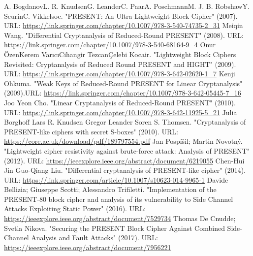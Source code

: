 \documentclass[journal=tosc,preprint]{iacrtrans}
\begin{document}
\begin{thebibliography}{}
	\bibitem{} A. BogdanovL. R. KnudsenG. LeanderC. PaarA. PoschmannM. J. B. RobshawY. SeurinC. Vikkelsoe. "PRESENT: An Ultra-Lightweight Block Cipher" (2007). 
	URL:  \href{https://link.springer.com/chapter/10.1007/978-3-540-74735-2_31} {https://link.springer.com/chapter/10.1007/978-3-540-74735-2\_31}
	\bibitem{} Meiqin Wang. "Differential Cryptanalysis of Reduced-Round PRESENT" (2008). URL: \href{https://link.springer.com/chapter/10.1007/978-3-540-68164-9_4}{https://link.springer.com/chapter/10.1007/978-3-540-68164-9\_4}
	\bibitem{} Onur ÖzenKerem VarıcıCihangir TezcanÇelebi Kocair. "Lightweight Block Ciphers
	Revisited: Cryptanalysis of Reduced Round PRESENT and HIGHT" (2009). URL: \href{https://link.springer.com/chapter/10.1007/978-3-642-02620-1_7}{https://link.springer.com/chapter/10.1007/978-3-642-02620-1\_7}
	\bibitem{} Kenji Ohkuma. "Weak Keys of Reduced-Round PRESENT for Linear Cryptanalysis"
	(2009).URL: \href{https://link.springer.com/chapter/10.1007/978-3-642-05445-7_16}{https://link.springer.com/chapter/10.1007/978-3-642-05445-7\_16}
	\bibitem{} Joo Yeon Cho. "Linear Cryptanalysis of Reduced-Round PRESENT" (2010). URL: \href{https://link.springer.com/chapter/10.1007/978-3-642-11925-5_21}{https://link.springer.com/chapter/10.1007/978-3-642-11925-5\_21}
	\bibitem{} Julia Borghoff Lars R. Knudsen Gregor Leander Soren S. Thomsen. "Cryptanalysis
	of PRESENT-like ciphers with secret S-boxes" (2010). URL: \href{https://core.ac.uk/download/pdf/189797554.pdf}{https://core.ac.uk/download/pdf/189797554.pdf}
	\bibitem{} Jan Pospíšil; Martin Novotný. "Lightweight cipher resistivity against brute-force
	attack: Analysis of PRESENT" (2012). URL: \href{https://ieeexplore.ieee.org/abstract/document/6219055}{https://ieeexplore.ieee.org/abstract/document/6219055}
	\bibitem{} Chen-Hui Jin Guo-Qiang Liu. "Differential cryptanalysis of PRESENT-like cipher"
	(2014). URL: \href{https://link.springer.com/article/10.1007/s10623-014-9965-1}{https://link.springer.com/article/10.1007/s10623-014-9965-1}
	\bibitem{} Davide Bellizia; Giuseppe Scotti; Alessandro Trifiletti. "Implementation of the
	PRESENT-80 block cipher and analysis of its vulnerability to Side Channel Attacks
	Exploiting Static Power" (2016). URL: \href{https://ieeexplore.ieee.org/abstract/document/7529734}{https://ieeexplore.ieee.org/abstract/document/7529734}
	\bibitem{} Thomas De Cnudde; Svetla Nikova. "Securing the PRESENT Block Cipher Against
	Combined Side-Channel Analysis and Fault Attacks" (2017). URL: \href{https://ieeexplore.ieee.org/abstract/document/7956221}{https://ieeexplore.ieee.org/abstract/document/7956221}
\end{thebibliography}
\end{document}
